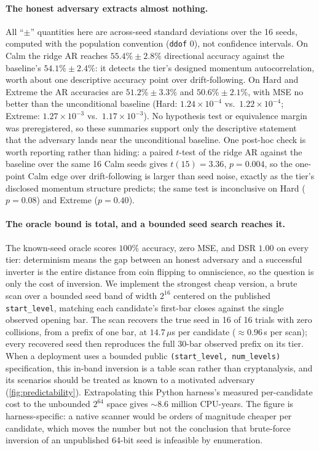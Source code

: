 \paragraph{The honest adversary extracts almost nothing.} All ``$\pm$'' quantities here are across-seed standard deviations over the 16 seeds, computed with the population convention (\texttt{ddof} 0), not confidence intervals. On Calm the ridge AR reaches $55.4\% \pm 2.8\%$ directional accuracy against the baseline's $54.1\% \pm 2.4\%$: it detects the tier's designed momentum autocorrelation, worth about one descriptive accuracy point over drift-following. On Hard and Extreme the AR accuracies are $51.2\% \pm 3.3\%$ and $50.6\% \pm 2.1\%$, with MSE no better than the unconditional baseline (Hard: $1.24\times10^{-4}$ vs.\ $1.22\times10^{-4}$; Extreme: $1.27\times10^{-3}$ vs.\ $1.17\times10^{-3}$). No hypothesis test or equivalence margin was preregistered, so these summaries support only the descriptive statement that the adversary lands near the unconditional baseline. One post-hoc check is worth reporting rather than hiding: a paired $t$-test of the ridge AR against the baseline over the same 16 Calm seeds gives $t(15) = 3.36$, $p = 0.004$, so the one-point Calm edge over drift-following is larger than seed noise, exactly as the tier's disclosed momentum structure predicts; the same test is inconclusive on Hard ($p = 0.08$) and Extreme ($p = 0.40$).

\paragraph{The oracle bound is total, and a bounded seed search reaches it.} The known-seed oracle scores $100\%$ accuracy, zero MSE, and DSR $1.00$ on every tier: determinism means the gap between an honest adversary and a successful inverter is the entire distance from coin flipping to omniscience, so the question is only the cost of inversion. We implement the strongest cheap version, a brute scan over a bounded seed band of width $2^{16}$ centered on the published \texttt{start\_level}, matching each candidate's first-bar closes against the single observed opening bar. The scan recovers the true seed in 16 of 16 trials with zero collisions, from a prefix of one bar, at $14.7\,\mu$s per candidate ($\approx 0.96$\,s per scan); every recovered seed then reproduces the full 30-bar observed prefix on its tier. When a deployment uses a bounded public \texttt{(start\_level, num\_levels)} specification, this in-band inversion is a table scan rather than cryptanalysis, and its scenarios should be treated as known to a motivated adversary (\cref{fig:predictability}). Extrapolating this Python harness's measured per-candidate cost to the unbounded $2^{64}$ space gives $\sim 8.6$ million CPU-years. The figure is harness-specific: a native scanner would be orders of magnitude cheaper per candidate, which moves the number but not the conclusion that brute-force inversion of an unpublished 64-bit seed is infeasible by enumeration.

